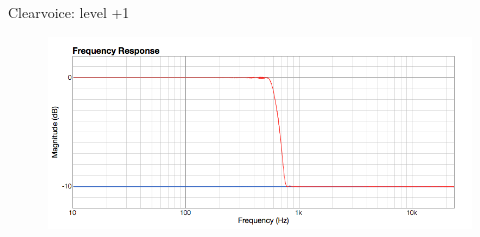 \documentclass{beamer}
\begin{document}
\begin{frame}[t]{Clearvoice: level +1}
\begin{figure}[b]
\includegraphics[height=0.37\textwidth]{figure/cv1.png}
\end{figure}

\end{frame}


\end{document}
